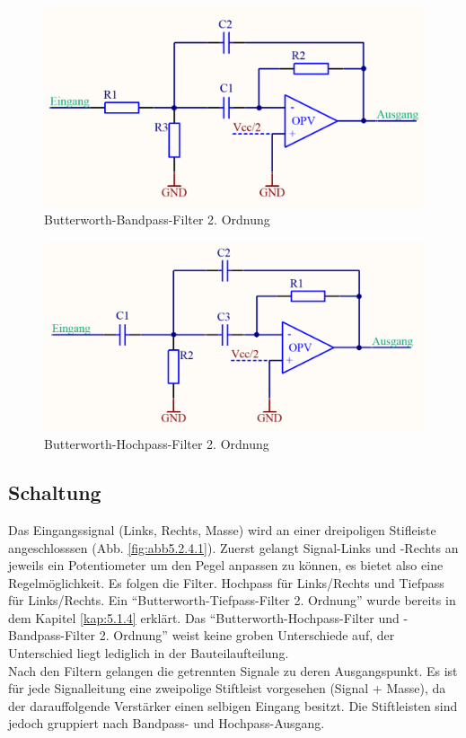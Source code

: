 \begin{figure} [ht]
	\centering
	\includegraphics[width=1\textwidth]{img/Print4/BPFilter-Butterworth2Ordnung.PNG}
	\caption{Butterworth-Bandpass-Filter 2. Ordnung}
	\label {fig:abb5.2.3.1}
\end{figure}

\begin{figure} [ht]
	\centering	
	\includegraphics[width=1\textwidth]{img/Print4/HPFilter-Butterworth2Ordnung.PNG}
	\caption{Butterworth-Hochpass-Filter 2. Ordnung}
	\label {fig:abb5.2.3.2}
\end{figure}

\subsection{Schaltung}\label{kap:5.2.4}

Das Eingangssignal (Links, Rechts, Masse) wird an einer dreipoligen Stifleiste angeschlosssen (Abb. \ref{fig:abb5.2.4.1}). Zuerst gelangt Signal-Links und -Rechts an jeweils ein Potentiometer um den Pegel anpassen zu können, es bietet also eine Regelmöglichkeit. Es folgen die Filter. Hochpass für Links/Rechts und Tiefpass für Links/Rechts. Ein \enquote{Butterworth-Tiefpass-Filter 2. Ordnung} wurde bereits in dem Kapitel \ref{kap:5.1.4} erklärt. Das \enquote{Butterworth-Hochpass-Filter und -Bandpass-Filter 2. Ordnung} weist keine groben Unterschiede auf, der Unterschied liegt lediglich in der Bauteilaufteilung.\\
Nach den Filtern gelangen die getrennten Signale zu deren Ausgangspunkt. Es ist für jede Signalleitung eine zweipolige Stiftleist vorgesehen (Signal + Masse), da der darauffolgende Verstärker einen selbigen Eingang besitzt. Die Stiftleisten sind jedoch gruppiert nach Bandpass- und Hochpass-Ausgang.

